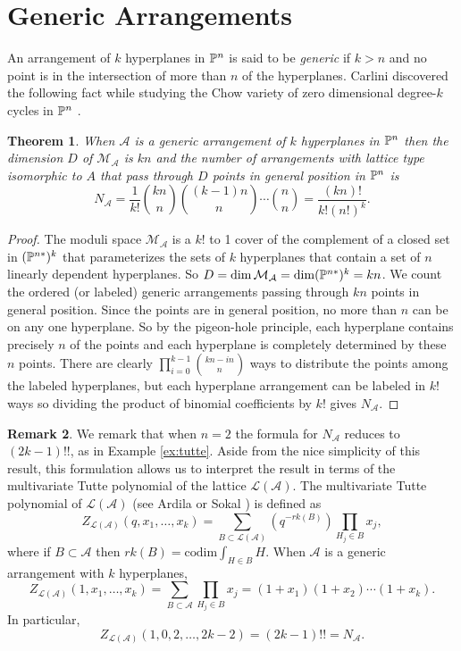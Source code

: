 \documentclass[12pt]{article}
\theoremstyle{plain}
\newtheorem{theorem}{Theorem}
\theoremstyle{definition}
\newtheorem{remark}[theorem]{Remark}
\newcommand{\A}{\mathcal{A}}
\newcommand{\M}{\mathcal{M}}
\newcommand{\N}{N}
\renewcommand{\L}{\mathcal{L}}
\newcommand{\MLA}{\M_{\A}}
\renewcommand{\P}{\ensuremath \mathbb{P}}
\newcommand{\codim}{\text{codim}}
\begin{document}
\section{Generic Arrangements} \label{section:generic}

An arrangement of $k$ hyperplanes in $\P^n$ is said to be {\em generic} if
$k > n$ and no point is in the intersection of more than $n$ of the
hyperplanes. Carlini discovered the following fact while studying the
Chow variety of zero dimensional degree-$k$ cycles in $\P^n$
\cite[Proposition 3.4]{Carlini}. 

\begin{theorem}\label{generics} When $\A$ is a generic arrangement of $k$ hyperplanes
  in $\P^n$ then the dimension $D$ of $\MLA$ is $kn$ and the number of
  arrangements with lattice type isomorphic to $A$ that pass through
  $D$ points in general position in $\P^n$ is $$ \N_\A = \frac{1}{k!}
  \binom{kn}{n} \binom{(k-1)n}{n} \cdots \binom{n}{n} =
  \frac{(kn)!}{k!(n!)^k}.$$ 
\end{theorem}

\begin{proof}
  The moduli space $\MLA$ is a $k!$ to 1 cover of the complement of a
  closed set in $(\P^{n*})^k$ that parameterizes the sets of $k$
  hyperplanes that contain a set of $n$ linearly dependent
  hyperplanes. So $D=\dim \MLA = \dim (\P^{n*})^k = kn$. We count the
  ordered (or labeled) generic arrangements passing through $kn$
  points in general position. Since the points are in general
  position, no more than $n$ can be on any one hyperplane. So by the
  pigeon-hole principle, each hyperplane contains precisely $n$ of the
  points and each hyperplane is completely determined by these $n$
  points. There are clearly $\prod_{i=0}^{k-1} \binom{kn-in}{n}$
  ways to distribute the points among the labeled hyperplanes, but each
  hyperplane arrangement can be labeled in $k!$ ways so dividing the
  product of binomial coefficients by $k!$ gives $\N_\A$.  
\end{proof}

\begin{remark}
We remark that when $n=2$ the formula for $\N_\A$ reduces to
$(2k-1)!!$, as in Example \ref{ex:tutte}. Aside from the nice simplicity of this result, this
formulation allows us to interpret the result in terms of the
multivariate Tutte polynomial of the lattice $\L(\A)$. The
multivariate Tutte polynomial of $\L(\A)$ (see Ardila \cite{Ardila} or Sokal
\cite{Sokal}) is defined as 
$$ Z_{\L(\A)}(q,x_1,\ldots,x_k) = \sum_{B \subset \L(\A)} (q^{-rk(B)})
\prod_{H_j \in B} x_j, $$ where if $B \subset
\A$ then $rk(B) = \codim \int_{H\in B} H.$ When $\A$ is
a generic arrangement with $k$ hyperplanes, $$Z_{\L(\A)}(1,x_1, \ldots,
x_k) = \sum_{B \subset \A} \prod_{H_j \in B} x_j =
(1+x_1)(1+x_2)\cdots (1+x_k).$$ In
particular, $$ Z_{\L(\A)}(1,0,2,\ldots,2k-2) = (2k-1)!! = \N_\A. $$ 
\end{remark}
\end{document}
